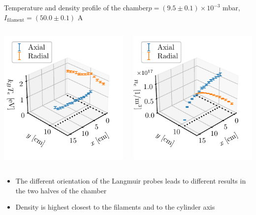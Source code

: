 \documentclass[10pt]{beamer}
\newcommand{\filamentcurrent}{\ensuremath{I_{\mathrm{filament}}}}
\begin{document}
\begin{frame}{Temperature and density profile of the chamber}{$p = (9.5 \pm 0.1) \times 10^{-3}$ mbar, $\filamentcurrent = (50.0 \pm 0.1)$ A}
    \begin{columns}
        \centering
        {\includegraphics[scale=1]{../figures/temperatureEV_profile.pdf}}
        
        \centering
        {\includegraphics[scale=1]{../figures/density_profile.pdf}}
        
    \end{columns}
    \begin{itemize}
        \item The different orientation of the Langmuir probes leads to different results in the two halves of the chamber
        \item Density is highest closest to the filaments and to the cylinder axis
    \end{itemize}
\end{frame}
\end{document}

